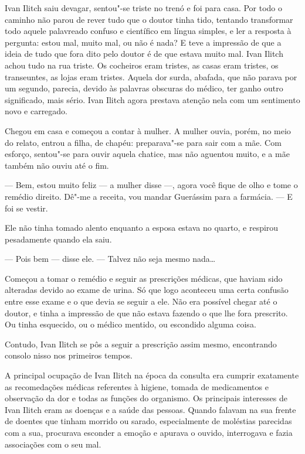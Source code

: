 Ivan Ilitch saiu devagar, sentou"-se triste no trenó e foi para casa. Por
todo o caminho não parou de rever tudo que o doutor tinha tido, tentando
transformar todo aquele palavreado confuso e científico em língua
simples, e ler a resposta à pergunta: estou mal, muito mal, ou não é
nada? E teve a impressão de que a ideia de tudo que fora dito pelo
doutor é de que estava muito mal. Ivan Ilitch achou tudo na rua triste.
Os cocheiros eram tristes, as casas eram tristes, os transeuntes, as
lojas eram tristes. Aquela dor surda, abafada, que não parava por um
segundo, parecia, devido às palavras obscuras do médico, ter ganho outro
significado, mais sério. Ivan Ilitch agora prestava atenção nela com um
sentimento novo e carregado.

Chegou em casa e começou a contar à mulher. A mulher ouvia, porém, no
meio do relato, entrou a filha, de chapéu: preparava"-se para sair com a
mãe. Com esforço, sentou"-se para ouvir aquela chatice, mas não aguentou
muito, e a mãe também não ouviu até o fim.

--- Bem, estou muito feliz --- a mulher disse ---, agora você fique de olho e
tome o remédio direito. Dê"-me a receita, vou mandar Guerássim para a
farmácia. --- E foi se vestir.

Ele não tinha tomado alento enquanto a esposa estava no quarto, e
respirou pesadamente quando ela saiu.

--- Pois bem --- disse ele. --- Talvez não seja mesmo nada\ldots{}

Começou a tomar o remédio e seguir as prescrições médicas, que haviam
sido alteradas devido ao exame de urina. Só que logo aconteceu uma certa
confusão entre esse exame e o que devia se seguir a ele. Não era
possível chegar até o doutor, e tinha a impressão de que não estava
fazendo o que lhe fora prescrito. Ou tinha esquecido, ou o médico
mentido, ou escondido alguma coisa.

Contudo, Ivan Ilitch se pôs a seguir a prescrição assim mesmo,
encontrando consolo nisso nos primeiros tempos.

A principal ocupação de Ivan Ilitch na época da consulta era cumprir
exatamente as recomedações médicas referentes à higiene, tomada de
medicamentos e observação da dor e todas as funções do organismo. Os
principais interesses de Ivan Ilitch eram as doenças e a saúde das
pessoas. Quando falavam na sua frente de doentes que tinham morrido ou
sarado, especialmente de moléstias parecidas com a sua, procurava
esconder a emoção e apurava o ouvido, interrogava e fazia associações
com o seu mal.

